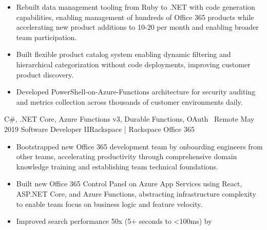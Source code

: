 \begin{experiences}
{\begin{itemize}
                              custom business rules, enabling secure fine-grained
                              client-side authorization and fast server-side validation
                              across multi-tenant SaaS platform.
                        \ifcv
                        \item Rebuilt data management tooling from Ruby to .NET with
                              code generation capabilities, enabling management of
                              hundreds of Office 365 products while accelerating new
                              product additions to 10-20 per month and enabling broader
                              team participation.
                        \item Built flexible product catalog system enabling dynamic
                              filtering and hierarchical categorization without code
                              deployments, improving customer product discovery.
                        \item Developed PowerShell-on-Azure-Functions architecture for
                              security auditing and metrics collection across thousands
                              of customer environments daily.
                        \fi
                      \end{itemize}
                    }
                    {C\#, .NET Core, Azure Functions v3, Durable Functions, OAuth}
                    {\faHome\ Remote}
  \emptySeparator
  \experience
    {May 2019}     {Software Developer II}{Rackspace | Rackspace Office 365}
    {}
                    {
                      \begin{itemize}
                        \item Bootstrapped new Office 365 development team by
                              onboarding engineers from other teams, accelerating
                              productivity through comprehensive domain knowledge
                              training and establishing team technical foundations.
                        \item Built new Office 365 Control Panel on Azure App Services
                              using React, ASP.NET Core, and Azure Functions,
                              abstracting infrastructure complexity to enable team
                              focus on business logic and feature velocity.
                        \item Improved search performance 50x (5+ seconds to <100ms) by

\end{itemize}}
\end{experiences}
